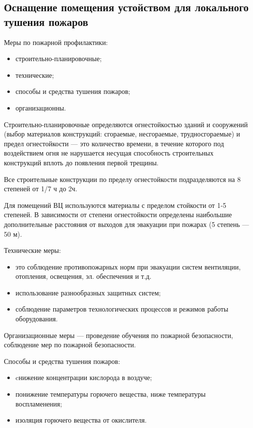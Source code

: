 \subsection{Оснащение помещения устойством для локального тушения пожаров}

Меры по пожарной профилактики:
\begin{itemize}
\item строительно-планировочные;
\item технические;
\item способы и средства тушения пожаров;
\item организационны.
\end{itemize}

Строительно-планировочные определяются огнестойкостью зданий и сооружений (выбор материалов конструкций: сгораемые, несгораемые,
трудносгораемые) и предел огнестойкости — это количество времени, в течение которого под воздействием огня не нарушается
несущая способность строительных конструкций вплоть до появления первой трещины.

Все строительные конструкции по пределу огнестойкости подразделяются на 8 степеней от 1/7 ч до 2ч.

Для помещений ВЦ используются материалы с пределом стойкости от 1-5 степеней. В зависимости от степени огнестойкости определены
наибольшие дополнительные расстояния от выходов для эвакуации при пожарах (5 степень — 50 м).

Технические меры:
\begin{itemize}
\item это соблюдение противопожарных норм при эвакуации систем вентиляции, отопления, освещения, эл. обеспечения и т.д.
\item использование разнообразных защитных систем;
\item соблюдение параметров технологических процессов и режимов работы оборудования.
\end{itemize}

Организационные меры — проведение обучения по пожарной безопасности, соблюдение мер по пожарной безопасности.

Способы и средства тушения пожаров:
\begin{itemize}
\item cнижение концентрации кислорода в воздуче;
\item понижение температуры горючего вещества, ниже температуры воспламенения;
\item изоляция горючего вещества от окислителя.
\end{itemize}

